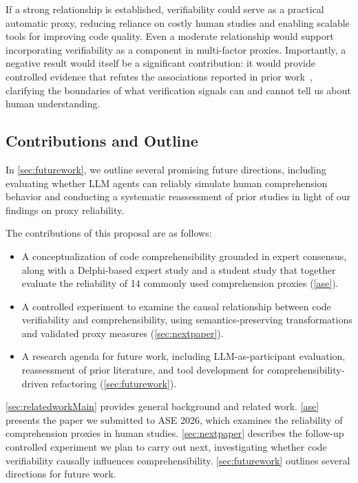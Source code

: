 If a strong relationship is established, verifiability could serve as a practical automatic proxy, reducing reliance on costly human studies and enabling scalable tools for improving code quality. Even a moderate relationship would support incorporating verifiability as a component in multi-factor proxies. Importantly, a negative result would itself be a significant contribution: it would provide controlled evidence that refutes the associations reported in prior work~\cite{FeldmanKC2023}, clarifying the boundaries of what verification signals can and cannot tell us about human understanding.

\subsection{Contributions and Outline}

In \cref{sec:futurework}, we outline several promising future directions, including evaluating whether LLM agents can reliably simulate human comprehension behavior and conducting a systematic reassessment of prior studies in light of our findings on proxy reliability.

The contributions of this proposal are as follows:
\begin{itemize}
    \item A conceptualization of code comprehensibility grounded in expert consensus, along with a Delphi-based expert study and a student study that together evaluate the reliability of 14 commonly used comprehension proxies (\cref{ase}).
    \item A controlled experiment to examine the causal relationship between code verifiability and comprehensibility, using semantics-preserving transformations and validated proxy measures (\cref{sec:nextpaper}).
    \item A research agenda for future work, including LLM-as-participant evaluation, reassessment of prior literature, and tool development for comprehensibility-driven refactoring (\cref{sec:futurework}).
\end{itemize}

\cref{sec:relatedworkMain} provides general background and related work. \cref{ase} presents the paper we submitted to ASE 2026, which examines the reliability of comprehension proxies in human studies. \cref{sec:nextpaper} describes the follow-up controlled experiment we plan to carry out next, investigating whether code verifiability causally influences comprehensibility. \cref{sec:futurework} outlines several directions for future work.